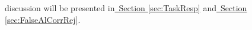 discussion will be presented in\hyperref[sec:TaskResp]{~Section \ref*{sec:TaskResp}} and\hyperref[sec:FalseAlCorrRej]{~Section \ref*{sec:FalseAlCorrRej}}.\\

